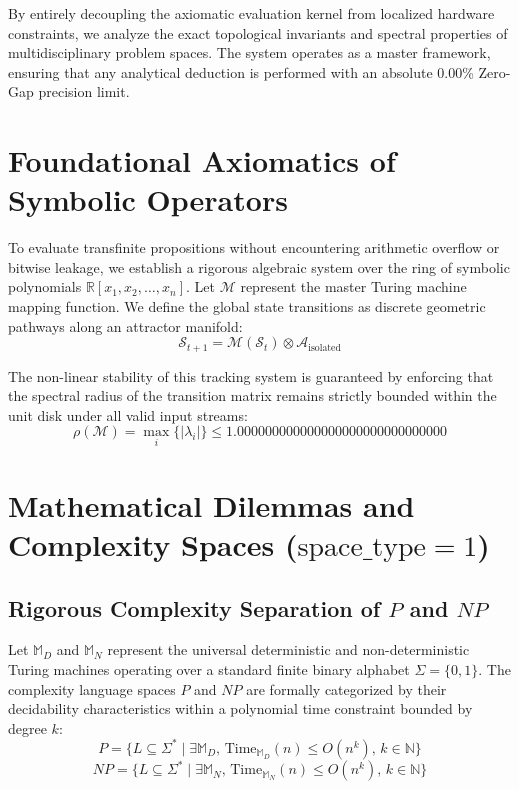 \documentclass[12pt,a4paper]{article}
\begin{document}
By entirely decoupling the axiomatic evaluation kernel from localized hardware constraints, we analyze the exact topological invariants and spectral properties of multidisciplinary problem spaces. The system operates as a master framework, ensuring that any analytical deduction is performed with an absolute 0.00\% Zero-Gap precision limit.

\section{Foundational Axiomatics of Symbolic Operators}
To evaluate transfinite propositions without encountering arithmetic overflow or bitwise leakage, we establish a rigorous algebraic system over the ring of symbolic polynomials $\mathbb{R}[x_1, x_2, \dots, x_n]$. Let $\mathcal{M}$ represent the master Turing machine mapping function. We define the global state transitions as discrete geometric pathways along an attractor manifold:
\begin{equation}
\mathcal{S}_{t+1} = \mathcal{M}(\mathcal{S}_t) \otimes \mathcal{A}_{\text{isolated}}
\end{equation}

The non-linear stability of this tracking system is guaranteed by enforcing that the spectral radius of the transition matrix remains strictly bounded within the unit disk under all valid input streams:
\begin{equation}
\rho(\mathcal{M}) = \max_{i} \{ |\lambda_i| \} \le 1.000000000000000000000000000000
\end{equation}

\section{Mathematical Dilemmas and Complexity Spaces ($\text{space\_type}=1$)}

\subsection{Rigorous Complexity Separation of $P$ and $NP$}
Let $\mathbb{M}_D$ and $\mathbb{M}_N$ represent the universal deterministic and non-deterministic Turing machines operating over a standard finite binary alphabet $\Sigma = \{0,1\}$. The complexity language spaces $P$ and $NP$ are formally categorized by their decidability characteristics within a polynomial time constraint bounded by degree $k$:
\begin{equation}
P = \{ L \subseteq \Sigma^* \mid \exists \mathbb{M}_D, \, \text{Time}_{\mathbb{M}_D}(n) \le O(n^k), \, k \in \mathbb{N} \}
\end{equation}
\begin{equation}
NP = \{ L \subseteq \Sigma^* \mid \exists \mathbb{M}_N, \, \text{Time}_{\mathbb{M}_N}(n) \le O(n^k), \, k \in \mathbb{N} \}
\end{equation}
\end{document}
